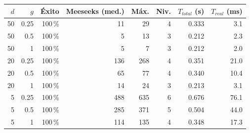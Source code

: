 \begin{tabular}{rrrrrrrr}
\toprule
$d$ & $g$ & Éxito & Meeseeks (med.) & Máx. & Niv. & $T_{total}$ (s) & $T_{real}$ (ms) \\
\midrule
50 & 0.25 & 100\,\% & 11 & 29 & 4 & 0.333 & 3.1 \\
50 & 0.5 & 100\,\% & 5 & 13 & 3 & 0.212 & 2.3 \\
50 & 1 & 100\,\% & 5 & 7 & 3 & 0.212 & 2.0 \\
20 & 0.25 & 100\,\% & 136 & 268 & 4 & 0.351 & 21.0 \\
20 & 0.5 & 100\,\% & 65 & 77 & 4 & 0.340 & 10.4 \\
20 & 1 & 100\,\% & 14 & 24 & 3 & 0.213 & 3.1 \\
5 & 0.25 & 100\,\% & 488 & 635 & 6 & 0.676 & 76.1 \\
5 & 0.5 & 100\,\% & 285 & 371 & 5 & 0.504 & 44.0 \\
5 & 1 & 100\,\% & 114 & 135 & 4 & 0.348 & 17.3 \\
\bottomrule
\end{tabular}
